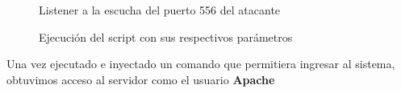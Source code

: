 \documentclass[a4paper]{article}
\begin{document}
\begin{figure}[H]
  \centering
  \setlength{\fboxrule}{0.8pt}
  \caption{Listener a la escucha del puerto 556 del atacante}
\end{figure}

\begin{figure}[H]
  \centering
  \setlength{\fboxrule}{0.8pt}
  \caption{Ejecución del script con sus respectivos parámetros}
\end{figure}

\vspace{0.4cm}
Una vez ejecutado e inyectado un comando que permitiera ingresar al sistema, obtuvimos acceso al servidor como el usuario
\textbf{Apache}
\vspace{0.4cm}

\begin{figure}[H]
  \centering
  \setlength{\fboxrule}{0.8pt}
\end{figure}
\end{document}
